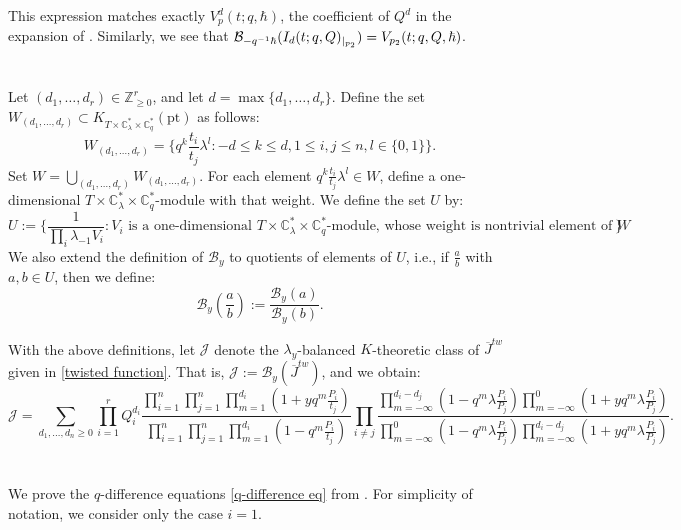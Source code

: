 \documentclass{amsart}
\begin{document}
This expression matches exactly $V^d_p(t;q,\hbar)$, the coefficient of $Q^d$ in the expansion of   . Similarly, we see that $\mathcal{B}_{-q^{-1}\hbar}(I_d(t;q,Q)_{\arrowvert_{p_2}}) = V_{p_2}(t;q,Q,\hbar)$.
\appendix
\section{}\label{Appendix A}
Let $(d_1,\dots,d_r) \in \mathbb{Z}_{\geq 0}^r$, and let $d = \max\{d_1,\dots,d_r\}$. Define the set $W_{(d_1,\dots,d_r)} \subset K_{T \times \mathbb{C}^*_{\lambda} \times \mathbb{C}^*_q}(\mathrm{pt})$ as follows:
\[
W_{(d_1,\dots,d_r)} = \big\{ q^k \frac{t_i}{t_j}\lambda^l : -d \leq k \leq d, 1 \leq i,j \leq n, l \in \{0,1\}\big\}.
\]
Set $W = \bigcup_{(d_1,\dots,d_r)}W_{(d_1,\dots,d_r)}$. For each element $q^k \frac{t_i}{t_j}\lambda^l \in W$, define a one-dimensional $T \times \mathbb{C}^*_{\lambda} \times \mathbb{C}^*_q$-module with that weight. We define the set $U$ by:
\[
U := \big\{\frac{1}{\prod_{i}\lambda_{-1}V_i}: \text{$V_i$ is a one-dimensional $T \times \mathbb{C}^*_{\lambda} \times \mathbb{C}^*_q$-module, whose weight is nontrivial element of $W$ } \big\}
\]
We also extend the definition of $\mathcal{B}_y$ to quotients of elements of $U$, i.e., if $\frac{a}{b}$ with $a,b \in U$, then we define:
\[
\mathcal{B}_y(\frac{a}{b}):= \frac{\mathcal{B}_y(a)}{\mathcal{B}_y(b)}.
\]

With the above definitions, let $\mathcal{J}$ denote the $\lambda_y$-balanced $K$-theoretic class of $\overline{J}^{tw}$ given in \eqref{twisted function}. That is, $\mathcal{J}:= \mathcal{B}_y(\overline{J}^{tw})$, and we obtain:
\[
\mathcal{J} = \sum_{d_1,\dots,d_n\geq 0}\prod_{i=1}^rQ_i^{d_i}\frac{\prod_{i=1}^n\prod_{j=1}^{n}\prod_{m=1}^{d_i}(1+yq^m\frac{P_i}{t_j})}{\prod_{i=1}^n\prod_{j=1}^{n}\prod_{m=1}^{d_i}(1-q^m\frac{P_i}{t_j})}\prod_{i\neq j}\frac{\prod_{m=-\infty}^{d_i-d_j} (1-q^m\lambda\frac{P_i}{P_j})\prod_{m=-\infty}^{0} (1+yq^m\lambda\frac{P_i}{P_j})}{\prod_{m=-\infty}^{0} (1-q^m\lambda\frac{P_i}{P_j}) \prod_{m=-\infty}^{d_i-d_j} (1+yq^m\lambda\frac{P_i}{P_j})}.
\]

\section{}\label{Appendix B}
We prove the $q$-difference equations \eqref{q-difference eq} from . For simplicity of notation, we consider only the case $i=1$. 
\end{document}
